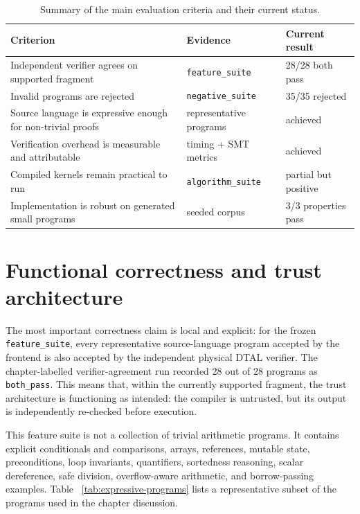 \begin{table}[h]
  \centering
  \begin{tabular}{l l l}
    \hline
    \textbf{Criterion}                                          & \textbf{Evidence}         & \textbf{Current result} \\
    \hline
    Independent verifier agrees on supported fragment           & \texttt{feature\_suite}   & 28/28 both pass         \\
    Invalid programs are rejected                               & \texttt{negative\_suite}  & 35/35 rejected          \\
    Source language is expressive enough for non-trivial proofs & representative programs   & achieved                \\
    Verification overhead is measurable and attributable        & timing + SMT metrics      & achieved                \\
    Compiled kernels remain practical to run                    & \texttt{algorithm\_suite} & partial but positive    \\
    Implementation is robust on generated small programs        & seeded corpus             & 3/3 properties pass     \\
    \hline
  \end{tabular}
  \caption{Summary of the main evaluation criteria and their current status.}
  \label{tab:eval-summary}
\end{table}

\section{Functional correctness and trust architecture}

The most important correctness claim is local and explicit: for the frozen
\texttt{feature\_suite}, every representative source-language program accepted
by the frontend is also accepted by the independent physical DTAL verifier. The
chapter-labelled verifier-agreement run recorded 28 out of 28 programs as
\texttt{both\_pass}. This means that, within the currently supported fragment,
the trust architecture is functioning as intended: the compiler is untrusted,
but its output is independently re-checked before execution.

This feature suite is not a collection of trivial arithmetic programs. It
contains explicit conditionals and comparisons, arrays, references, mutable
state, preconditions, loop invariants, quantifiers, sortedness reasoning,
scalar dereference, safe division, overflow-aware arithmetic, and
borrow-passing examples. Table
~\ref{tab:expressive-programs} lists a representative subset of the programs
used in the chapter discussion.

